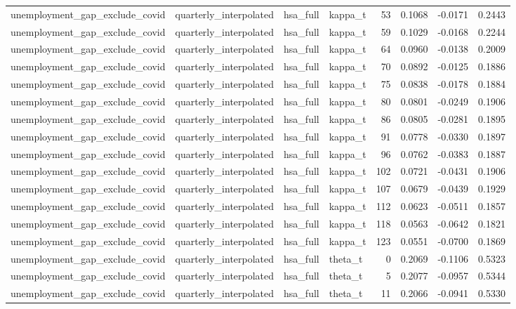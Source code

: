 \begin{tabular}{llllrrrr}
unemployment\_gap\_exclude\_covid & quarterly\_interpolated & hsa\_full & kappa\_t & 53 & 0.1068 & -0.0171 & 0.2443 \\
unemployment\_gap\_exclude\_covid & quarterly\_interpolated & hsa\_full & kappa\_t & 59 & 0.1029 & -0.0168 & 0.2244 \\
unemployment\_gap\_exclude\_covid & quarterly\_interpolated & hsa\_full & kappa\_t & 64 & 0.0960 & -0.0138 & 0.2009 \\
unemployment\_gap\_exclude\_covid & quarterly\_interpolated & hsa\_full & kappa\_t & 70 & 0.0892 & -0.0125 & 0.1886 \\
unemployment\_gap\_exclude\_covid & quarterly\_interpolated & hsa\_full & kappa\_t & 75 & 0.0838 & -0.0178 & 0.1884 \\
unemployment\_gap\_exclude\_covid & quarterly\_interpolated & hsa\_full & kappa\_t & 80 & 0.0801 & -0.0249 & 0.1906 \\
unemployment\_gap\_exclude\_covid & quarterly\_interpolated & hsa\_full & kappa\_t & 86 & 0.0805 & -0.0281 & 0.1895 \\
unemployment\_gap\_exclude\_covid & quarterly\_interpolated & hsa\_full & kappa\_t & 91 & 0.0778 & -0.0330 & 0.1897 \\
unemployment\_gap\_exclude\_covid & quarterly\_interpolated & hsa\_full & kappa\_t & 96 & 0.0762 & -0.0383 & 0.1887 \\
unemployment\_gap\_exclude\_covid & quarterly\_interpolated & hsa\_full & kappa\_t & 102 & 0.0721 & -0.0431 & 0.1906 \\
unemployment\_gap\_exclude\_covid & quarterly\_interpolated & hsa\_full & kappa\_t & 107 & 0.0679 & -0.0439 & 0.1929 \\
unemployment\_gap\_exclude\_covid & quarterly\_interpolated & hsa\_full & kappa\_t & 112 & 0.0623 & -0.0511 & 0.1857 \\
unemployment\_gap\_exclude\_covid & quarterly\_interpolated & hsa\_full & kappa\_t & 118 & 0.0563 & -0.0642 & 0.1821 \\
unemployment\_gap\_exclude\_covid & quarterly\_interpolated & hsa\_full & kappa\_t & 123 & 0.0551 & -0.0700 & 0.1869 \\
unemployment\_gap\_exclude\_covid & quarterly\_interpolated & hsa\_full & theta\_t & 0 & 0.2069 & -0.1106 & 0.5323 \\
unemployment\_gap\_exclude\_covid & quarterly\_interpolated & hsa\_full & theta\_t & 5 & 0.2077 & -0.0957 & 0.5344 \\
unemployment\_gap\_exclude\_covid & quarterly\_interpolated & hsa\_full & theta\_t & 11 & 0.2066 & -0.0941 & 0.5330 \\

\end{tabular}

